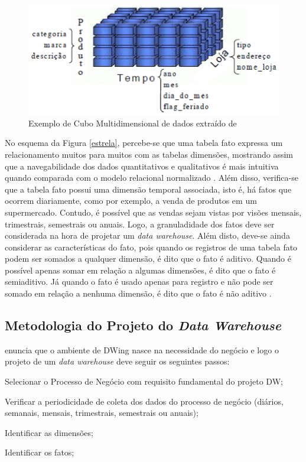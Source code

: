 \begin{figure}[h!]
\centering
\includegraphics[keepaspectratio=false,scale=0.85]{figuras/cube.eps}
\caption{Exemplo de Cubo Multidimensional de dados extraído de }
\label{cube}
\end{figure}
\FloatBarrier


No esquema da Figura \ref{estrela}, percebe-se que uma tabela fato expressa um relacionamento muitos para muitos com as tabelas dimensões, mostrando assim que a navegabilidade dos dados quantitativos e qualitativos é mais intuitiva quando comparada com o modelo relacional normalizado \cite{Kimball2002}. Além disso, verifica-se que a tabela fato possui uma dimensão temporal associada, isto é, há fatos que ocorrem diariamente, como por exemplo, a venda de produtos em um supermercado. Contudo, é possível que as vendas sejam vistas por visões mensais, trimestrais, semestrais ou anuais. Logo, a granuladidade dos fatos deve ser considerada na hora de projetar um \textit{data warehouse}. Além disto, deve-se ainda considerar as características do fato, pois quando os registros de uma tabela fato podem ser somados a qualquer dimensão, é dito que o fato é aditivo. Quando é possível apenas somar em relação a algumas dimensões, é dito que o fato é semiaditivo. Já quando o fato é usado apenas para registro e não pode ser somado em relação a nenhuma dimensão, é dito que o fato é não aditivo \cite{Inmon1992}.

\subsection{Metodologia do Projeto do \textit{Data Warehouse}}
\label{metodologia-dw}
 enuncia que o ambiente de DWing nasce na necessidade do negócio e logo o projeto de um \textit{data warehouse} deve seguir os seguintes passos: 

\begin{inparaenum}[1)]
	\item Selecionar o Processo de Negócio com requisito fundamental do 
	projeto DW;
	
	\item Verificar a periodicidade de coleta dos dados do processo de negócio (diários, semanais, mensais, trimestrais, semestrais ou anuais);
	
	\item Identificar as dimensões;
	
	\item Identificar os fatos;

\end{inparaenum} 


